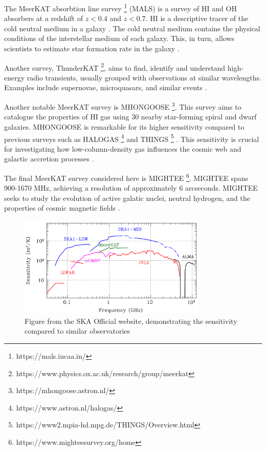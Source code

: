 \documentclass[preprint,linenumbers, longauthor]{aastex631}
\begin{document}
The MeerKAT absorbtion line survey \footnote{https://mals.iucaa.in/} (MALS) is a survey of HI and OH absorbers at a redshift of $z < 0.4$ and $z < 0.7$. 
HI is a descriptive tracer of the cold neutral medium in a galaxy \citep{guptaBlindOHAbsorption2021}. 
The cold neutral medium contains the physical conditions of the interstellar medium of each galaxy. This, in turn, allows scientists to estimate star formation rate in the galaxy \citep{guptaBlindOHAbsorption2021}.

Another survey, ThunderKAT \footnote{https://www.physics.ox.ac.uk/research/group/meerkat}, aims to find, identify and understand high-energy radio transients, usually grouped with observations at similar wavelengths.
Examples include supernovae, microquasars, and similar events \citep{woudtThunderKATMeerKATLarge2018}.

Another notable MeerKAT survey is MHONGOOSE \footnote{https://mhongoose.astron.nl/}. This survey aims to catalogue the properties of HI gas using 30 nearby star-forming spiral and dwarf galaxies. 
MHONGOOSE is remarkable for its higher sensitivity compared to previous surveys such as HALOGAS \footnote{https://www.astron.nl/halogas/} and THINGS \footnote{https://www2.mpia-hd.mpg.de/THINGS/Overview.html} \citep{deblokMHONGOOSEMeerKATNearby2024}. 
This sensitivity is crucial for investigating how low-column-density gas influences the cosmic web and galactic accretion processes \citep{deblokMHONGOOSEMeerKATNearby2024}.

The final MeerKAT survey considered here is MIGHTEE \footnote{https://www.mighteesurvey.org/home}. MIGHTEE spans 900-1670 MHz, achieving a resolution of approximately 6 arcseconds. MIGHTEE seeks to study the evolution of active galatic nuclei, neutral hydrogen, and the properties of cosmic magnetic fields \citep{MIGHTEESurvey}.

\begin{figure}[h!]
  \centering
  \includegraphics[width=0.8\textwidth]{SKA_Graph.png}
  \caption{Figure from the SKA Official website, demonstrating the sensitivity compared to similar observatories}
  \label{fig:SKA_Graph}
\end{figure}
\end{document}
